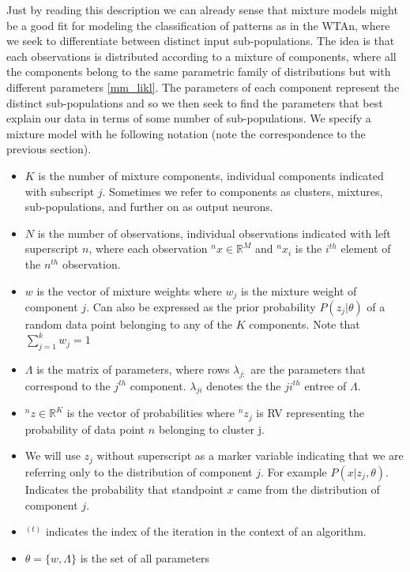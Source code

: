 \documentclass{article}
\begin{document}
Just by reading this description we can already sense that mixture
models might be a good fit for modeling the classification of patterns as
in the WTAn, where we seek to differentiate between distinct input sub-populations. The idea is
that each observations is distributed according to a mixture of components, where all the components belong to the same parametric family of distributions but with different parameters \eqref{mm_likl}. The parameters of each component represent the distinct sub-populations and so we then seek to find the parameters that best explain our data in terms of some number of sub-populations. We specify a mixture model with he following notation (note the correspondence to the previous section).

\begin{itemize}
\item
  \(K\) is the number of mixture components, individual components indicated
  with subscript \(j\). Sometimes we refer to components as clusters, mixtures, sub-populations, and further on as output neurons. 
\item
  \(N\) is the number of observations, individual observations indicated with
  left superscript \(n\), where each observation
  $^nx \in \mathbb{R}^M$ and \(^nx_i\) is the \(i^{th}\)
  element of the \(n^{th}\) observation.
\item
  \(w\) is the vector of mixture weights
  where \(w_j\) is the mixture weight of component \(j\). Can also be
  expressed as the prior probability \(P(z_j|\theta)\) of a random data
  point belonging to any of the \(K\) components. Note that
  \(\sum_{j=1}^k w_j = 1\)
\item
  \(\Lambda\) is the matrix of parameters, where rows
  \(\lambda_{j:}\) are the parameters that correspond to the $j^{th}$ component.
  \(\lambda_{ji}\) denotes the the \(ji^{th}\) entree of $\Lambda$.
\item
  $^nz \in \mathbb{R}^K$ is the vector of probabilities where \(^nz_j\) is
  RV representing the probability of data point \(n\) belonging to
  cluster j.
\item
We will use $z_j$ without superscript as a marker variable indicating that we are referring only to the distribution of component $j$. For example $P(x | z_j , \theta)$. Indicates the probability that standpoint $x$ came from the distribution of component $j$.
\item
  $^{(t)}$ indicates the index of the iteration in the context of an algorithm.
\item
  \(\theta = \{w, \Lambda\}\) is the set of all parameters
\end{itemize}
\end{document}
